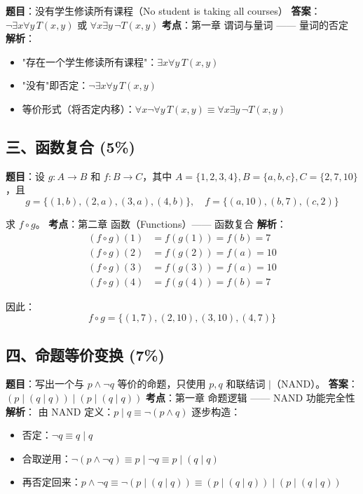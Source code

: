 \documentclass[10pt,a4paper,openany]{ctexbook}
\theoremstyle{definition}
\theoremstyle{remark}
\begin{document}
\textbf{题目}：没有学生修读所有课程（No student is taking all courses）
\textbf{答案}：$\neg \exists x \forall y\, T(x, y)$ 或 $\forall x \exists y\, \neg T(x, y)$
\textbf{考点}：第一章 谓词与量词 —— 量词的否定
\textbf{解析}：
\begin{itemize}
\item "存在一个学生修读所有课程"：$\exists x \forall y\, T(x, y)$
\item "没有"即否定：$\neg \exists x \forall y\, T(x, y)$
\item 等价形式（将否定内移）：$\forall x \neg \forall y\, T(x, y) \equiv \forall x \exists y\, \neg T(x, y)$

\end{itemize}

\vspace{-2pt}

\subsection{三、函数复合 (5\%)}

\textbf{题目}：设 $g: A \to B$ 和 $f: B \to C$，其中 $A = \{1, 2, 3, 4\}, B = \{a, b, c\}, C = \{2, 7, 10\}$，且
\[
g = \{(1, b), (2, a), (3, a), (4, b)\}, \quad f = \{(a, 10), (b, 7), (c, 2)\}
\]

求 $f \circ g$。
\textbf{考点}：第二章 函数（Functions）—— 函数复合
\textbf{解析}：
\[
\begin{aligned}
(f \circ g)(1) &= f(g(1)) = f(b) = 7 \\
(f \circ g)(2) &= f(g(2)) = f(a) = 10 \\
(f \circ g)(3) &= f(g(3)) = f(a) = 10 \\
(f \circ g)(4) &= f(g(4)) = f(b) = 7
\end{aligned}
\]

因此：
\[
f \circ g = \{(1, 7), (2, 10), (3, 10), (4, 7)\}
\]

\vspace{-2pt}

\subsection{四、命题等价变换 (7\%)}

\textbf{题目}：写出一个与 $p \land \neg q$ 等价的命题，只使用 $p, q$ 和联结词 $|$（NAND）。
\textbf{答案}：$(p \mid (q \mid q)) \mid (p \mid (q \mid q))$
\textbf{考点}：第一章 命题逻辑 —— NAND 功能完全性
\textbf{解析}：
由 NAND 定义：$p \mid q \equiv \neg(p \land q)$
逐步构造：
\begin{itemize}
\item 否定：$\neg q \equiv q \mid q$
\item 合取逆用：$\neg(p \land \neg q) \equiv p \mid \neg q \equiv p \mid (q \mid q)$
\item 再否定回来：$p \land \neg q \equiv \neg(p \mid (q \mid q)) \equiv (p \mid (q \mid q)) \mid (p \mid (q \mid q))$

\end{itemize}
\end{document}
